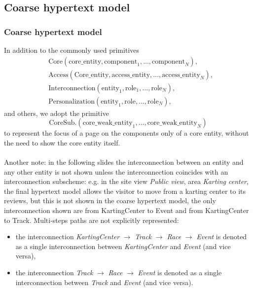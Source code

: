 \documentclass{beamer}
\begin{document}
\subsection{Coarse hypertext model}

\begin{frame}
    \frametitle{Coarse hypertext model}
    \tiny
    In addition to the commonly used primitives
    \begin{align*}
        &\text{Core}(\text{core\_entity},\text{component}_1,\dots,\text{component}_N), \\
        &\text{Access}(\text{Core\_entity},\text{access\_entity},\dots,\text{access\_entity}_N), \\
        &\text{Interconnection}(\text{entity}_1, \text{role}_1, \dots, \text{role}_N), \\
        &\text{Personalization}(\text{entity}_1, \text{role}, \dots, \text{role}_N),
    \end{align*}
        and others, we adopt the primitive 
    $$ \text{CoreSub.}(\text{core\_weak\_entity}_1,\dots,\text{core\_weak\_entity}_N) $$
    to represent the focus of a page on the components only of a core entity, without the need to show the core entity itself. \\
    \hfill\\
    Another note: in the following slides the interconnection between an entity and any other entity is not shown unless the interconnection
    coincides with an interconnection subscheme: e.g. in the site view \textit{Public view}, area \textit{Karting center}, the final hypertext model 
    allows the visitor to move from a karting center to its reviews, but this is not shown in the coarse hypertext model, the
    only interconnection shown are from KartingCenter to Event and from KartingCenter to Track.
    Multi-steps paths are not explicitly represented:
    \begin{itemize}
    \item the interconnection \textit{KartingCenter} $\rightarrow$ \textit{Track} $\rightarrow$ \textit{Race} $\rightarrow$ \textit{Event}
    is denoted as a single interconnection between \textit{KartingCenter} and \textit{Event} (and vice versa),
    \item the interconnection \textit{Track} $\rightarrow $ \textit{Race} $\rightarrow$ \textit{Event} is denoted as 
    a single interconnection between \textit{Track} and \textit{Event} (and vice versa).
    \end{itemize}
\end{frame}
\end{document}
